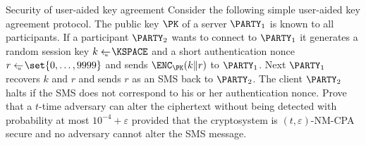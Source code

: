 \documentclass{crypto-exercise}
\author{Sven Laur}
\begin{document}
\begin{exercise}{Security of user-aided key agreement}
Consider the following simple user-aided key agreement protocol. The public key $\PK$ of a server $\PARTY_1$ is known to all participants. If a participant $\PARTY_2$ wants to connect to $\PARTY_1$ it generates a random session key $k\getsu\KSPACE$ and a short authentication nonce $r\getsu\set{0,\ldots,9999}$ and sends $\ENC_\PK(k\|r)$ to $\PARTY_1$. Next $\PARTY_1$ recovers $k$ and $r$ and sends $r$ as an SMS back to $\PARTY_2$. The client $\PARTY_2$ halts if the SMS does not correspond to his or her authentication nonce.
Prove that a $t$-time adversary can alter the ciphertext without being detected with probability at most $10^{-4}+\varepsilon$ provided that the cryptosystem is $(t,\varepsilon)$-NM-CPA secure and no adversary cannot alter the SMS message.
\end{exercise}
\end{document}
